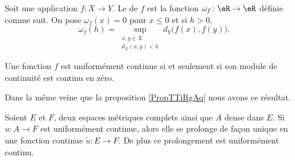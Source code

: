 \begin{definition}
    Soit une application \( f\colon X\to Y\). Le  de \( f\) est la fonction \( \omega_f\colon \eR\to \eR\) définie comme suit. On pose \( \omega_f(x)=0\) pour \( x\leq 0\) et si \( h>0\),
    \begin{equation}
        \omega_f(h)=\sup_{\substack{x,y\in X\\d_X(x,y)<h}} d_Y\big( f(x),f(y) \big).
    \end{equation}
\end{definition}

\begin{lemma}   \label{LemeERapq}
    Une fonction \( f\) est uniformément continue si et seulement si son module de continuité est continu en zéro.
\end{lemma}

Dans la même veine que la proposition \ref{PropTTiRgAq} nous avons ce résultat.
\begin{theorem}      \label{ThoPVFQMi}
    Soient \( E\) et \( F\), deux espaces métriques complets ainsi que \( A\) dense dans \( E\). Si \( u\colon A\to F\) est uniformément continue, alors elle se prolonge de façon unique en une fonction continue \( \tilde u\colon E\to F\). De plus ce prolongement est uniformément continu.
\end{theorem}


